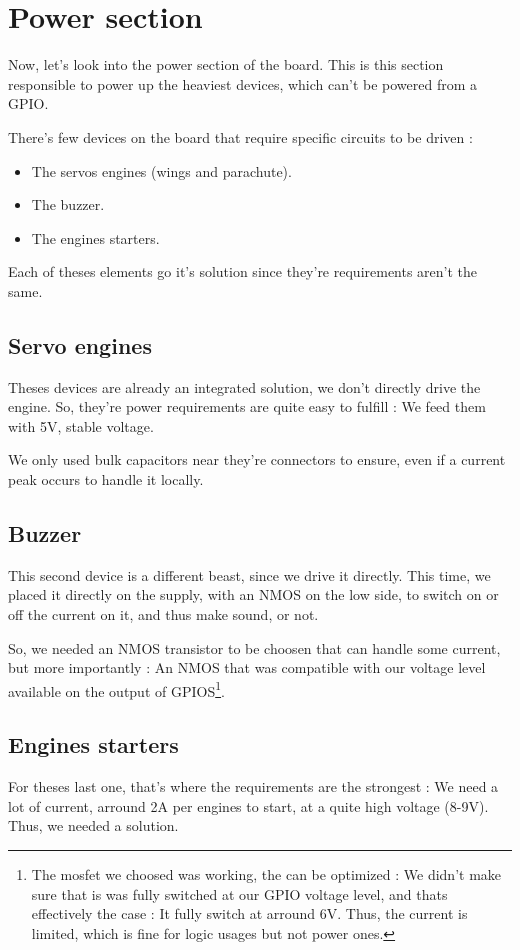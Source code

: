 \section{Power section}
Now, let's look into the power section of the board. This is this section responsible to
power up the heaviest devices, which can't be powered from a GPIO.

There's few devices on the board that require specific circuits to be driven :

\begin{itemize}[noitemsep]
    \item   The servos engines (wings and parachute).
    \item   The buzzer.
    \item   The engines starters.
\end{itemize}

Each of theses elements go it's solution since they're requirements aren't the same.

\subsection{Servo engines}
Theses devices are already an integrated solution, we don't directly drive the engine.
So, they're power requirements are quite easy to fulfill : We feed them with 5V, stable 
voltage. 

We only used bulk capacitors near they're connectors to ensure, even if a current peak 
occurs to handle it locally.

\subsection{Buzzer}
This second device is a different beast, since we drive it directly. This time, we placed 
it directly on the supply, with an NMOS on the low side, to switch on or off the current 
on it, and thus make sound, or not.

So, we needed an NMOS transistor to be choosen that can handle some current, but more 
importantly : An NMOS that was compatible with our voltage level available on the output 
of GPIOS\footnote{
    The mosfet we choosed was working, the can be optimized : We didn't make sure that is 
    was fully switched at our GPIO voltage level, and thats effectively the case : It fully 
    switch at arround 6V. Thus, the current is limited, which is fine for logic usages but
    not power ones.
}.

\subsection{Engines starters}
For theses last one, that's where the requirements are the strongest : We need a lot of
current, arround 2A per engines to start, at a quite high voltage (8-9V). Thus, we needed
a solution.

